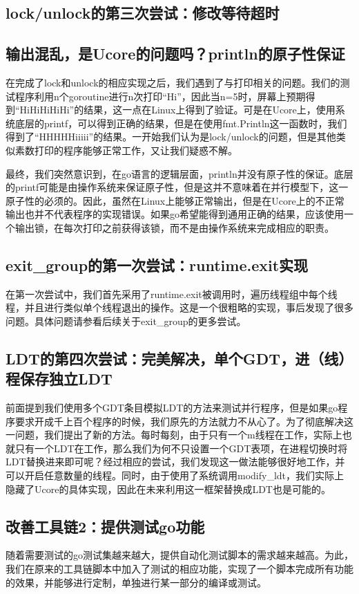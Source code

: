 \documentclass{article}
\begin{document}
\subsection{lock/unlock的第三次尝试：修改等待超时}

\subsection{输出混乱，是Ucore的问题吗？println的原子性保证}
在完成了lock和unlock的相应实现之后，我们遇到了与打印相关的问题。我们的测试程序利用n个goroutine进行n次打印“Hi”，因此当n=5时，屏幕上预期得到“HiHiHiHiHi”的结果，这一点在Linux上得到了验证。可是在Ucore上，使用系统底层的printf，可以得到正确的结果，但是在使用fmt.Println这一函数时，我们得到了“HHHHHiiiii”的结果。一开始我们认为是lock/unlock的问题，但是其他类似素数打印的程序能够正常工作，又让我们疑惑不解。

最终，我们突然意识到，在go语言的逻辑层面，println并没有原子性的保证。底层的printf可能是由操作系统来保证原子性，但是这并不意味着在并行模型下，这一原子性的必须的。因此，虽然在Linux上能够正常输出，但是在Ucore上的不正常输出也并不代表程序的实现错误。如果go希望能得到通用正确的结果，应该使用一个输出锁，在每次打印之前获得该锁，而不是由操作系统来完成相应的职责。

\subsection{exit\_group的第一次尝试：runtime.exit实现}
在第一次尝试中，我们首先采用了runtime.exit被调用时，遍历线程组中每个线程，并且进行类似单个线程退出的操作。这是一个很粗略的实现，事后发现了很多问题。具体问题请参看后续关于exit\_group的更多尝试。

\subsection{LDT的第四次尝试：完美解决，单个GDT，进（线）程保存独立LDT}
前面提到我们使用多个GDT条目模拟LDT的方法来测试并行程序，但是如果go程序要求开成千上百个程序的时候，我们原先的方法就力不从心了。为了彻底解决这一问题，我们提出了新的方法。每时每刻，由于只有一个m线程在工作，实际上也就只有一个LDT在工作，那么我们为何不只设置一个GDT表项，在进程切换时将LDT替换进来即可呢？经过相应的尝试，我们发现这一做法能够很好地工作，并可以开启任意数量的线程。同时，由于使用了系统调用modify\_ldt，我们实际上隐藏了Ucore的具体实现，因此在未来利用这一框架替换成LDT也是可能的。

\subsection{改善工具链2：提供测试go功能}
随着需要测试的go测试集越来越大，提供自动化测试脚本的需求越来越高。为此，我们在原来的工具链脚本中加入了测试的相应功能，实现了一个脚本完成所有功能的效果，并能够进行定制，单独进行某一部分的编译或测试。
\end{document}
